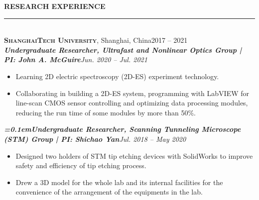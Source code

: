 \documentclass[letterpaper,11pt]{article}
\begin{document}
{\Large\bfseries{}RESEARCH EXPERIENCE}\\
\rule[1.5ex]{\columnwidth}{1pt}
\vspace{-4ex}\\
{\large\bfseries\scshape{}ShanghaiTech University}, Shanghai, China\hfill{2017 -- 2021}\\
{\bfseries\itshape{}Undergraduate Researcher, Ultrafast and Nonlinear Optics Group | PI: John A. McGuire}\hfill{\itshape{}Jun. 2020 -- Jul. 2021}\\
\vspace{-4ex}
\begin{itemize}
    \item Learning 2D electric spectroscopy (2D-ES) experiment technology.
    \item Collaborating in building a 2D-ES system, programming with LabVIEW for line-scan CMOS sensor controlling and optimizing data processing modules, reducing the run time of some modules by more than 50\%.
\end{itemize}
\vspace{-1ex}
{\bfseries\itshape{}\font=0.1em{}Undergraduate Researcher, Scanning Tunneling Microscope (STM) Group | PI: Shichao Yan}\hfill{\itshape{}Jul. 2018 -- May 2020}\\
\vspace{-4ex}
\begin{itemize}
    \item Designed two holders of STM tip etching devices with SolidWorks to improve safety and efficiency of tip etching process.
    \item Drew a 3D model for the whole lab and its internal facilities for the convenience of the arrangement of the equipments in the lab.
\end{itemize}
\end{document}
